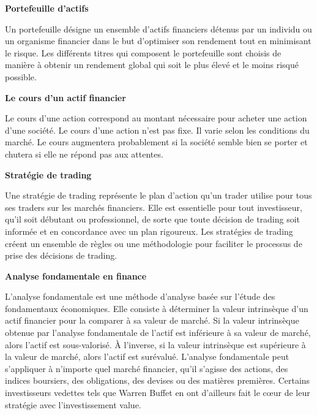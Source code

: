  \begin{center}
    \textbf{Portefeuille d'actifs}
\end{center}
Un portefeuille désigne un ensemble d'actifs financiers détenus par un individu ou un organisme 
financier dans le but d'optimiser son rendement tout en minimisant le risque. Les différents 
titres qui composent le portefeuille sont choisis de manière à obtenir un rendement global qui 
soit le plus élevé et le moins risqué possible.

\begin{center}
    \textbf{Le cours d'un actif financier}
\end{center}
Le cours d'une action correspond au montant nécessaire pour acheter une action d'une société. 
Le cours d'une action n'est pas fixe. Il varie selon les conditions du marché. Le cours augmentera 
probablement si la société semble bien se porter et chutera si elle ne répond pas aux attentes.

\begin{center}
    \textbf{Stratégie de trading}
\end{center}
Une stratégie de trading représente le plan d'action qu'un trader utilise pour tous ses traders 
sur les marchés financiers. Elle est essentielle pour tout investisseur, qu'il soit débutant ou 
professionnel, de sorte que toute décision de trading soit informée et en concordance avec un plan 
rigoureux. Les stratégies de trading créent un ensemble de règles ou une méthodologie pour 
faciliter le processus de prise des décisions de trading.

\begin{center}
    \textbf{Analyse fondamentale en finance}
\end{center}
L'analyse fondamentale est une méthode d'analyse basée sur l'étude des fondamentaux économiques. 
Elle consiste à déterminer la valeur intrinsèque d'un actif financier pour la comparer à sa valeur 
de marché. Si la valeur intrinsèque obtenue par l'analyse fondamentale de l'actif est inférieure à 
sa valeur de marché, alors l'actif est sous-valorisé. À l'inverse, si la valeur intrinsèque est 
supérieure à la valeur de marché, alors l'actif est surévalué. L'analyse fondamentale peut 
s'appliquer à n'importe quel marché financier, qu'il s'agisse des actions, des indices boursiers, 
des obligations, des devises ou des matières premières. Certains investisseurs vedettes tels que 
Warren Buffet en ont d'ailleurs fait le cœur de leur stratégie avec l'investissement value.

